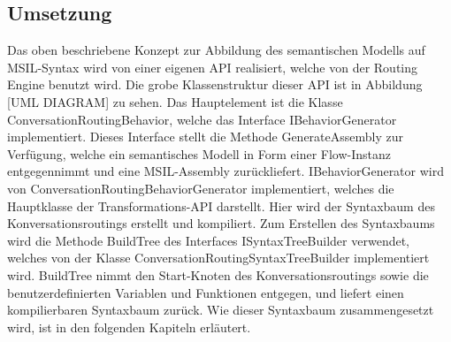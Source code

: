 \subsection{Umsetzung}
Das oben beschriebene Konzept zur Abbildung des semantischen Modells auf MSIL-Syntax wird von einer eigenen API realisiert, welche von der Routing Engine benutzt wird. Die grobe Klassenstruktur dieser API ist in Abbildung [UML DIAGRAM] zu sehen. Das Hauptelement ist die Klasse ConversationRoutingBehavior, welche das Interface IBehaviorGenerator implementiert. Dieses Interface stellt die Methode GenerateAssembly zur Verfügung, welche ein semantisches Modell in Form einer Flow-Instanz entgegennimmt und eine MSIL-Assembly zurückliefert. IBehaviorGenerator wird von ConversationRoutingBehaviorGenerator implementiert, welches die Hauptklasse der Transformations-API darstellt. Hier wird der Syntaxbaum des Konversationsroutings erstellt und kompiliert. Zum Erstellen des Syntaxbaums wird die Methode BuildTree des Interfaces ISyntaxTreeBuilder verwendet, welches von der Klasse ConversationRoutingSyntaxTreeBuilder implementiert wird. BuildTree nimmt den Start-Knoten des Konversationsroutings sowie die benutzerdefinierten Variablen und Funktionen entgegen, und liefert einen kompilierbaren Syntaxbaum zurück. Wie dieser Syntaxbaum zusammengesetzt wird, ist in den folgenden Kapiteln erläutert. 

